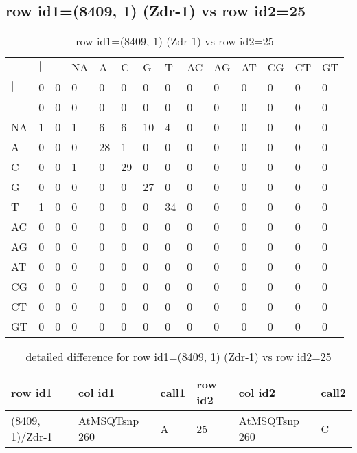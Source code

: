 \subsection{row id1=(8409, 1) (Zdr-1) vs row id2=25}
\begin{center}
\begin{longtable}{|l|l|l|l|l|l|l|l|l|l|l|l|l|l|}
\caption{row id1=(8409, 1) (Zdr-1) vs row id2=25} \label{table_dm486}\\
\hline
\\
\hline
&$|$&-&NA&A&C&G&T&AC&AG&AT&CG&CT&GT\\
$|$&0&0&0&0&0&0&0&0&0&0&0&0&0\\
-&0&0&0&0&0&0&0&0&0&0&0&0&0\\
NA&1&0&1&6&6&10&4&0&0&0&0&0&0\\
A&0&0&0&28&1&0&0&0&0&0&0&0&0\\
C&0&0&1&0&29&0&0&0&0&0&0&0&0\\
G&0&0&0&0&0&27&0&0&0&0&0&0&0\\
T&1&0&0&0&0&0&34&0&0&0&0&0&0\\
AC&0&0&0&0&0&0&0&0&0&0&0&0&0\\
AG&0&0&0&0&0&0&0&0&0&0&0&0&0\\
AT&0&0&0&0&0&0&0&0&0&0&0&0&0\\
CG&0&0&0&0&0&0&0&0&0&0&0&0&0\\
CT&0&0&0&0&0&0&0&0&0&0&0&0&0\\
GT&0&0&0&0&0&0&0&0&0&0&0&0&0\\
\hline
\end{longtable}
\end{center}

\begin{center}
\begin{longtable}{|l|l|l|l|l|l|}
\caption{detailed difference for row id1=(8409, 1) (Zdr-1) vs row id2=25} \label{table_dm487}\\
\hline
row id1&col id1&call1&row id2&col id2&call2\\
\hline
(8409, 1)/Zdr-1&AtMSQTsnp 260&A&25&AtMSQTsnp 260&C\\
\hline
\end{longtable}
\end{center}

